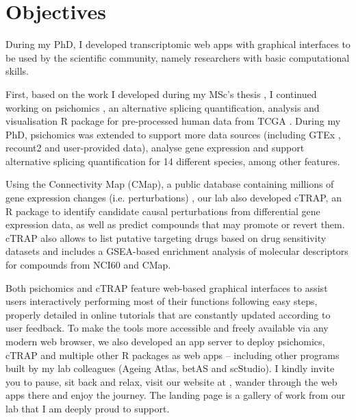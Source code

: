 \chapter{Objectives}

During my PhD, I developed transcriptomic web apps with graphical interfaces to be used by the scientific community, namely researchers with basic computational skills.

First, based on the work I developed during my MSc's thesis \cite{}, I continued working on psichomics \cite{saraiva-agostinho:2018uq,saraiva-agostinho:2020wz}, an alternative splicing quantification, analysis and visualisation R package for pre-processed human data from TCGA \cite{chang:2013ww}. During my PhD, psichomics was extended to support more data sources (including GTEx \cite{lonsdale:2013uo}, recount2 \cite{collado-torres:2017uw} and user-provided data), analyse gene expression and support alternative splicing quantification for 14 different species, among other features.

Using the Connectivity Map (CMap), a public database containing millions of gene expression changes (i.e. perturbations) \cite{subramanian:2017ul}, our lab also developed cTRAP, an R package to identify candidate causal perturbations from differential gene expression data, as well as predict compounds that may promote or revert them. cTRAP also allows to list putative targeting drugs based on drug sensitivity datasets and includes a GSEA-based enrichment analysis of molecular descriptors for compounds from NCI60 and CMap.

Both psichomics and cTRAP feature web-based graphical interfaces to assist users interactively performing most of their functions following easy steps, properly detailed in online tutorials that are constantly updated according to user feedback. To make the tools more accessible and freely available via any modern web browser, we also developed an app server to deploy psichomics, cTRAP and multiple other R packages as web apps -- including other programs built by my lab colleagues (Ageing Atlas, betAS and scStudio). I kindly invite you to pause, sit back and relax, visit our website at , wander through the web apps there and enjoy the journey. The landing page is a gallery of work from our lab that I am deeply proud to support.
